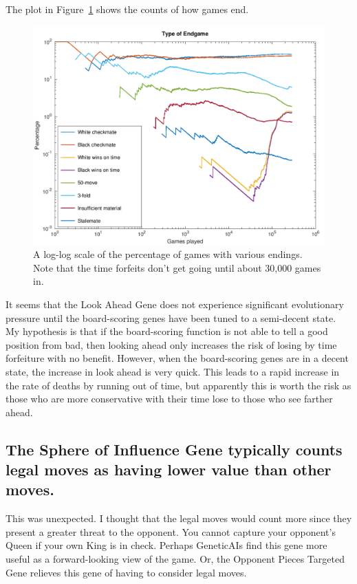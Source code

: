 \documentclass[letterpaper]{article}
\renewcommand{\_}{\allowbreak\textunderscore\allowbreak}
\begin{document}
The plot in Figure~\ref{game-ending-plot} shows the counts of how games end.
\begin{figure}[htb]
	\centering
	\includegraphics[width=\textwidth]{game-endings-log-plot}
	\caption{A log-log scale of the percentage of games with various endings. Note that the time forfeits don't get going until about 30,000 games in.}\label{game-ending-plot}
\end{figure}
It seems that the Look Ahead Gene does not experience significant evolutionary pressure until the board-scoring genes have been tuned to a semi-decent state. My hypothesis is that if the board-scoring function is not able to tell a good position from bad, then looking ahead only increases the risk of losing by time forfeiture with no benefit. However, when the board-scoring genes are in a decent state, the increase in look ahead is very quick. This leads to a rapid increase in the rate of deaths by running out of time, but apparently this is worth the risk as those who are more conservative with their time lose to those who see farther ahead.

\subsection{The Sphere of Influence Gene typically counts legal moves as having lower value than other moves.}

This was unexpected. I thought that the legal moves would count more since they present a greater threat to the opponent. You cannot capture your opponent's Queen if your own King is in check. Perhaps Genetic\_AIs find this gene more useful as a forward-looking view of the game. Or, the Opponent Pieces Targeted Gene relieves this gene of having to consider legal moves.
\end{document}
